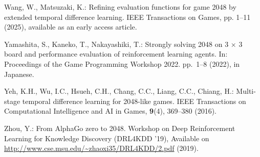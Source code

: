 \begin{thebibliography}{10}
Wang, W., Matsuzaki, K.: Refining evaluation functions for game 2048 by
  extended temporal difference learning. IEEE Transactions on Games, pp. 1--11
  (2025), available as an early access article.

Yamashita, S., Kaneko, T., Nakayashiki, T.: Strongly solving 2048 on 3 × 3
  board and performance evaluation of reinforcement learning agents. In:
  Proceedings of the Game Programming Workshop 2022. pp.~1--8 (2022), in
  Japanese.

Yeh, K.H., Wu, I.C., Hsueh, C.H., Chang, C.C., Liang, C.C., Chiang, H.:
  Multi-stage temporal difference learning for 2048-like games. IEEE
  Transactions on Computational Intelligence and AI in Games, \textbf{9}(4),
  369--380 (2016).

Zhou, Y.: From {AlphaGo} zero to 2048. Workshop on Deep Reinforcement Learning
  for Knowledge Discovery (DRL4KDD '19), Available on
  \url{http://www.cse.msu.edu/~zhaoxi35/DRL4KDD/2.pdf} (2019).

\end{thebibliography}
